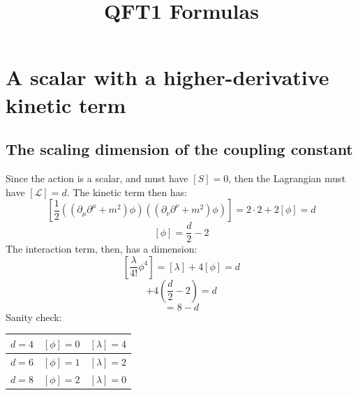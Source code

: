 \documentclass{article}
\title{QFT1 Formulas}
\begin{document}
\maketitle

\section{A scalar with a higher-derivative kinetic term}
\subsection{The scaling dimension of the coupling constant}
Since the action is a scalar, and must have $[S] = 0$, then the Lagrangian must have $[\mathcal{L}] = d$. The kinetic term then has:
\begin{equation}
    \left[
        \frac{1}{2}((\partial_\mu\partial^\mu + m^2)\phi)((\partial_\nu\partial^\nu + m^2)\phi)
    \right] = 2\cdot2 + 2[\phi] = d
\end{equation}
\begin{equation}
    \left[\phi\right] = \frac{d}{2} - 2
\end{equation}
The interaction term, then, has a dimension:
\begin{equation}
    \left[\frac{\lambda}{4!}\phi^4\right] = [\lambda] + 4[\phi] = d
\end{equation}
\begin{equation}
    [\lambda] + 4\left(\frac{d}{2} - 2\right) = d
\end{equation}
\begin{equation}
    [\lambda] = 8 - d
\end{equation}
Sanity check:
\begin{center}
\begin{tabular}{ c c c }
    $d = 4$ & $[\phi] = 0$ & $[\lambda] = 4$ \\ \hline
    $d = 6$ & $[\phi] = 1$ & $[\lambda] = 2$ \\ \hline
    $d = 8$ & $[\phi] = 2$ & $[\lambda] = 0$
\end{tabular}
\end{center}
\end{document}
